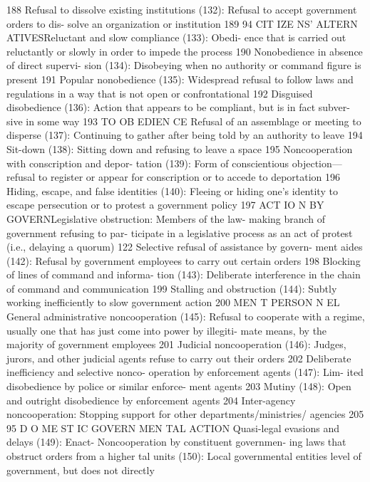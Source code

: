 \documentclass[twoside,a4paper,12pt,fleqn,openany]{extbook}
\begin{document}
 188
Refusal to dissolve existing institutions (132):
Refusal to accept government orders to dis-
solve an organization or institution
 189
94
CIT IZE NS’ ALTERN ATIVESReluctant and slow compliance (133): Obedi-
ence that is carried out reluctantly or slowly in
order to impede the process
 190
Nonobedience in absence of direct supervi-
sion (134): Disobeying when no authority or
command figure is present
 191
Popular nonobedience (135): Widespread
refusal to follow laws and regulations in a way
that is not open or confrontational
 192
Disguised disobedience (136): Action that
appears to be compliant, but is in fact subver-
sive in some way
 193
TO OB EDIEN CE
Refusal of an assemblage or meeting to
disperse (137): Continuing to gather after being
told by an authority to leave
 194
Sit-down (138): Sitting down and refusing to
leave a space
 195
Noncooperation with conscription and depor-
tation (139): Form of conscientious objection—
refusal to register or appear for conscription or
to accede to deportation
 196
Hiding, escape, and false identities (140):
Fleeing or hiding one’s identity to escape
persecution or to protest a government
policy
 197
ACT IO N BY GOVERNLegislative obstruction: Members of the law-
making branch of government refusing to par-
ticipate in a legislative process as an act of
protest (i.e., delaying a quorum)
 122
Selective refusal of assistance by govern-
ment aides (142): Refusal by government
employees to carry out certain orders
 198
Blocking of lines of command and informa-
tion (143): Deliberate interference in the chain
of command and communication
 199
Stalling and obstruction (144): Subtly working
inefficiently to slow government action 200
MEN T PERSON N EL
General administrative noncooperation (145):
Refusal to cooperate with a regime, usually
one that has just come into power by illegiti-
mate means, by the majority of government
employees
 201
Judicial noncooperation (146): Judges, jurors,
and other judicial agents refuse to carry out
their orders
 202
Deliberate inefficiency and selective nonco-
operation by enforcement agents (147): Lim-
ited disobedience by police or similar enforce-
ment agents
 203
Mutiny (148): Open and outright disobedience
by enforcement agents
 204
Inter-agency noncooperation: Stopping
support for other departments/ministries/
agencies
 205
95
D O ME ST IC GOVERN MEN TAL ACTION
Quasi-legal evasions and delays (149): Enact-
 Noncooperation by constituent governmen-
ing laws that obstruct orders from a higher
 tal units (150): Local governmental entities
level of government, but does not directly
\end{document}
